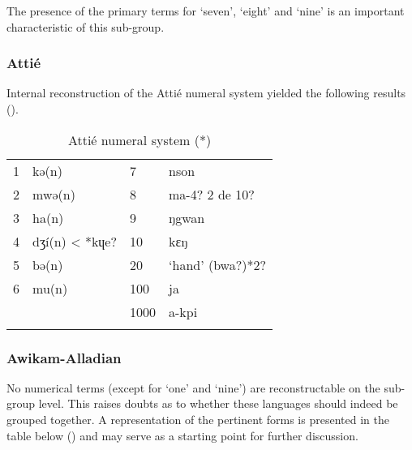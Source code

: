The presence of the primary terms for ‘seven’, ‘eight’ and ‘nine’ is an important characteristic of this sub-group. 


\newpage 
\subsubsection{Attié}%
Internal reconstruction of the Attié numeral system yielded the following results ().

\begin{table}
\caption{\label{tab:3:70}Attié numeral system (*)}


\begin{tabularx}{\textwidth}{lXlX}
\lsptoprule

1 & kə(n) & 7 & nson\\
2 & mwə(n) & 8 & ma-4? 2 de 10?\\
3 & ha(n) & 9 & ŋgwan\\
4 & dʒí(n) < *kɥe? & 10 & kɛŋ\\
5 & bə(n) & 20 & ‘hand' (bwa?)*2?\\
6 & mu(n) & 100 & ja\\
~ &  & 1000 & a-kpi\\
\lspbottomrule
\end{tabularx}
\end{table}


  
\subsubsection{Awikam-Alladian}%
No numerical terms (except for ‘one’ and `nine') are reconstructable on the sub-group level. This raises doubts as to whether these languages should indeed be grouped together. A representation of the pertinent forms is presented in the table below () and may serve as a starting point for further discussion.

